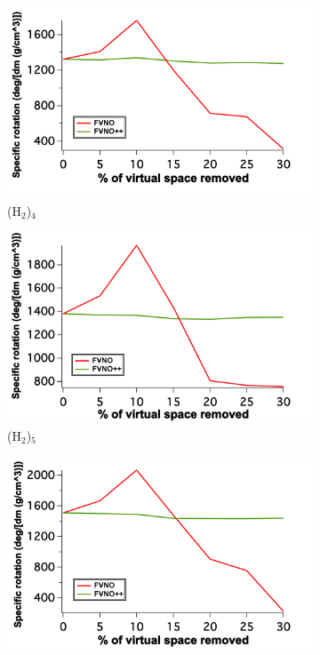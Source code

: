 \begin{figure}
\begin{subfigure}{.5\textwidth}
  \centering
  \includegraphics[width=.9\linewidth]{figures_fvno++/fvno++_h2_4_adz_optrot_lg.pdf}
  \caption{(H$_2$)$_4$}
  \label{fig:sfig1}
\end{subfigure}%
\begin{subfigure}{.5\textwidth}
  \centering
  \includegraphics[width=.9\linewidth]{figures_fvno++/fvno++_h2_5_adz_optrot_lg.pdf}
  \caption{(H$_2$)$_5$}
  \label{fig:sfig2}
\end{subfigure}
\begin{subfigure}{.5\textwidth}
  \centering
  \includegraphics[width=.9\linewidth]{figures_fvno++/fvno++_h2_6_adz_optrot_lg.pdf}

\end{subfigure}
\end{figure}
